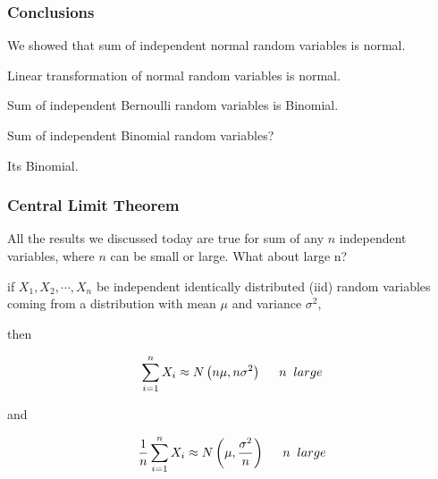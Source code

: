 \documentclass{beamer}\usepackage[]{graphicx}\usepackage[]{color}
\begin{document}
\begin{frame}[fragile]

\frametitle{Conclusions}

We showed that sum of independent normal random variables is normal. \pause \newline

Linear transformation of normal random variables is normal. \pause \newline

Sum of independent Bernoulli random variables is Binomial. \pause \newline

Sum of independent Binomial random variables?  \pause \newline

Its Binomial.

\end{frame}

\begin{frame}[fragile]

\frametitle{Central Limit Theorem}

All the results we discussed today are true for sum of any $n$ independent variables,
where $n$ can be small or large. What about large n? \pause \newline

if $X_1, X_2, \cdots, X_n$ be independent identically distributed (iid) random variables coming from a distribution with mean $\mu$ and variance $\sigma^2$, 

then 

$$ \sum_{i=1}^{n} X_{i} \approx N \left (n \mu, n \sigma^2 \right )  \hspace{0.5 cm} n \;\; large $$

and 

$$ \frac{1}{n}\sum_{i=1}^{n} X_{i} \approx N \left (\mu, \frac{\sigma^2}{n} \right ) \hspace{0.5 cm} n \;\; large$$

\end{frame}
\end{document}
